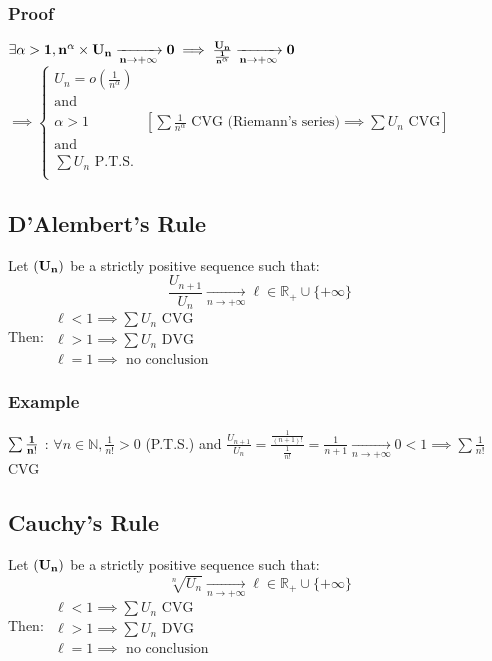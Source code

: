 \documentclass[notitlepage]{math}
\begin{document}
\subsubsection{Proof}
$\bf \exists \alpha > 1, n^\alpha \times U_n \xrightarrow[n \to +\infty]{} 0 \implies \frac{U_n}{\frac{1}{n^\alpha}} \xrightarrow[n \to +\infty]{} 0$\\
$\implies \left\{ \begin{array}{r|r}
    U_n = o(\frac{1}{n^\alpha}) &\\
    \text{and } &\\ 
    \alpha > 1 & \left[ \sum \frac{1}{n^\alpha} \text{ CVG (Riemann's series)} \implies \sum U_n \text{ CVG} \right]\\
    \text{and } &\\
    \sum U_n \text{ P.T.S.}& \\
\end{array} \right. $
\subsection{D'Alembert's Rule}
Let $\bf (U_n)$ be a strictly positive sequence such that:
\[ \frac{U_{n+1}}{U_n} \xrightarrow[n \to +\infty]{} \ell \in \mathbb{R}_+\cup \{+\infty\} \]
Then:
$\begin{array}{l}
    \ell < 1 \implies \sum U_n \text{ CVG}\\
    \ell > 1 \implies \sum U_n \text{ DVG}\\
    \ell = 1 \implies \text{ no conclusion}    
\end{array}$
\subsubsection{Example}
$\bf \sum \frac{1}{n!}$ : $\forall n \in \mathbb{N}, \frac{1}{n!} > 0$ (P.T.S.) and $\frac{U_{n+1}}{U_n} = \frac{\frac{1}{(n+1)!}}{\frac{1}{n!}} = \frac{1}{n+1} \xrightarrow[n \to +\infty]{} 0 < 1 \implies \sum \frac{1}{n!}$ CVG\\

\subsection{Cauchy's Rule}
Let $\bf (U_n)$ be a strictly positive sequence such that:
\[ \sqrt[n]{U_n} \xrightarrow[n \to +\infty]{} \ell \in \mathbb{R}_+\cup \{+\infty\} \]
Then:
$\begin{array}{l}
    \ell < 1 \implies \sum U_n \text{ CVG}\\
    \ell > 1 \implies \sum U_n \text{ DVG}\\
    \ell = 1 \implies \text{ no conclusion}
\end{array}$
\end{document}

